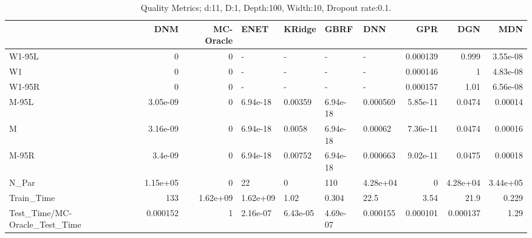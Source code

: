 \begin{table}
\centering
\caption{Quality Metrics; d:11, D:1, Depth:100, Width:10, Dropout rate:0.1.}
\begin{tabular}{lrrllllrrr}
\toprule
{} &      DNM &  MC-Oracle &     ENET &   KRidge &     GBRF &      DNN &      GPR &      DGN &      MDN \\
\midrule
W1-95L                        &        0 &          0 &        - &        - &        - &        - & 0.000139 &    0.999 & 3.55e-08 \\
W1                            &        0 &          0 &        - &        - &        - &        - & 0.000146 &        1 & 4.83e-08 \\
W1-95R                        &        0 &          0 &        - &        - &        - &        - & 0.000157 &     1.01 & 6.56e-08 \\
M-95L                         & 3.05e-09 &          0 & 6.94e-18 &  0.00359 & 6.94e-18 & 0.000569 & 5.85e-11 &   0.0474 &  0.00014 \\
M                             & 3.16e-09 &          0 & 6.94e-18 &   0.0058 & 6.94e-18 &  0.00062 & 7.36e-11 &   0.0474 &  0.00016 \\
M-95R                         &  3.4e-09 &          0 & 6.94e-18 &  0.00752 & 6.94e-18 & 0.000663 & 9.02e-11 &   0.0475 &  0.00018 \\
N\_Par                         & 1.15e+05 &          0 &       22 &        0 &      110 & 4.28e+04 &        0 & 4.28e+04 & 3.44e+05 \\
Train\_Time                    &      133 &   1.62e+09 & 1.62e+09 &     1.02 &    0.304 &     22.5 &     3.54 &     21.9 &    0.229 \\
Test\_Time/MC-Oracle\_Test\_Time & 0.000152 &          1 & 2.16e-07 & 6.43e-05 & 4.69e-07 & 0.000155 & 0.000101 & 0.000137 &     1.29 \\
\bottomrule
\end{tabular}
\end{table}
